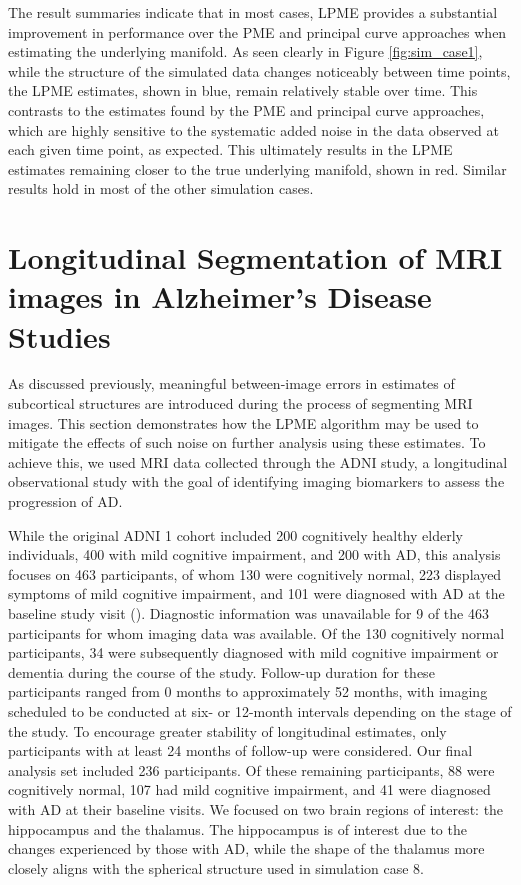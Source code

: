 \documentclass[12pt]{article}
\theoremstyle{definition}
\begin{document}
The result summaries indicate that in most cases, LPME provides a substantial improvement in performance over the PME and principal curve approaches when estimating the underlying manifold. As seen clearly in Figure \ref{fig:sim_case1}, while the structure of the simulated data changes noticeably between time points, the LPME estimates, shown in blue, remain relatively stable over time. This contrasts to the estimates found by the PME and principal curve approaches, which are highly sensitive to the systematic added noise in the data observed at each given time point, as expected. This ultimately results in the LPME estimates remaining closer to the true underlying manifold, shown in red. Similar results hold in most of the other simulation cases.



\section{Longitudinal Segmentation of MRI images in Alzheimer's Disease Studies}\label{s:application}

As discussed previously, meaningful between-image errors in estimates of subcortical structures are introduced during the process of segmenting MRI images. This section demonstrates how the LPME algorithm may be used to mitigate the effects of such noise on further analysis using these estimates. To achieve this, we used MRI data collected through the ADNI study, a longitudinal observational study with the goal of identifying imaging biomarkers to assess the progression of AD.

While the original ADNI 1 cohort included 200 cognitively healthy elderly individuals, 400 with mild cognitive impairment, and 200 with AD, this analysis focuses on 463 participants, of whom 130 were cognitively normal, 223 displayed symptoms of mild cognitive impairment, and 101 were diagnosed with AD at the baseline study visit (\cite{jack2008adni}). Diagnostic information was unavailable for 9 of the 463 participants for whom imaging data was available. Of the 130 cognitively normal participants, 34 were subsequently diagnosed with mild cognitive impairment or dementia during the course of the study. Follow-up duration for these participants ranged from 0 months to approximately 52 months, with imaging scheduled to be conducted at six- or 12-month intervals depending on the stage of the study. To encourage greater stability of longitudinal estimates, only participants with at least 24 months of follow-up were considered. Our final analysis set included 236 participants. Of these remaining participants, 88 were cognitively normal, 107 had mild cognitive impairment, and 41 were diagnosed with AD at their baseline visits. We focused on two brain regions of interest: the hippocampus and the thalamus. The hippocampus is of interest due to the changes experienced by those with AD, while the shape of the thalamus more closely aligns with the spherical structure used in simulation case 8.
\end{document}
